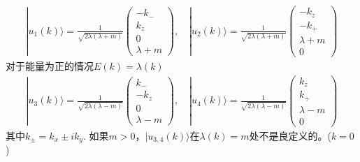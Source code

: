 \documentclass{article}
\numberwithin{equation}{subsection}
\begin{document}
\begin{equation}
    \begin{split}
        |u_1(k)\rangle=\frac{1}{\sqrt{2\lambda(\lambda+m)}}\begin{pmatrix}
            -k_-\\
            k_z\\
            0\\
            \lambda+m
        \end{pmatrix},\quad |u_2(k)\rangle=\frac{1}{\sqrt{2\lambda(\lambda+m)}}\begin{pmatrix}
            -k_z\\
            -k_+\\
            \lambda+m\\
            0
        \end{pmatrix}
    \end{split}
\end{equation}
对于能量为正的情况$E(k)=\lambda(k)$
\begin{equation*}
    \begin{split}
        |u_3(k)\rangle=\frac{1}{\sqrt{2\lambda(\lambda-m)}}\begin{pmatrix}
            k_-\\
            -k_z\\
            0\\
            \lambda-m
        \end{pmatrix},\quad |u_4(k)\rangle=\frac{1}{\sqrt{2\lambda(\lambda-m)}}\begin{pmatrix}
            k_z\\
            k_+\\
            \lambda-m\\
            0
        \end{pmatrix}
    \end{split}
\end{equation*}
其中$k_\pm=k_x\pm ik_y$. 如果$m>0$，$|u_{3,4}(k)\rangle$在$\lambda(k)=m$处不是良定义的。($k=0$)
\end{document}
